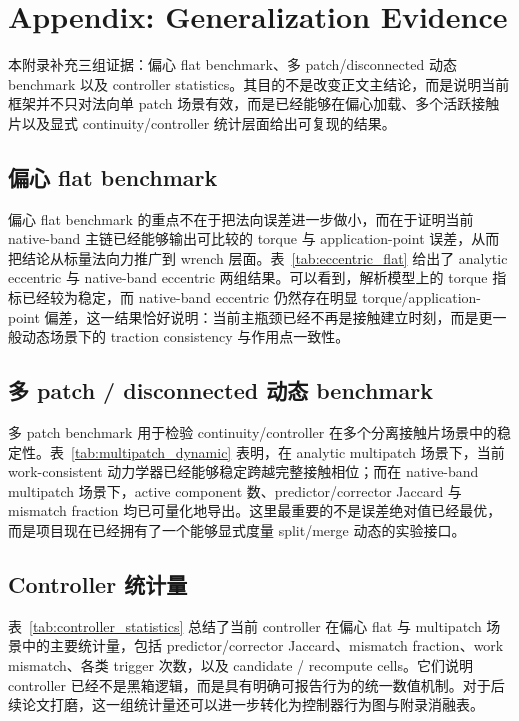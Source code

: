 \section{Appendix: Generalization Evidence}
本附录补充三组证据：偏心 flat benchmark、多 patch/disconnected 动态 benchmark 以及 controller statistics。其目的不是改变正文主结论，而是说明当前框架并不只对法向单 patch 场景有效，而是已经能够在偏心加载、多个活跃接触片以及显式 continuity/controller 统计层面给出可复现的结果。

\subsection{偏心 flat benchmark}
偏心 flat benchmark 的重点不在于把法向误差进一步做小，而在于证明当前 native-band 主链已经能够输出可比较的 torque 与 application-point 误差，从而把结论从标量法向力推广到 wrench 层面。表~\ref{tab:eccentric_flat} 给出了 analytic eccentric 与 native-band eccentric 两组结果。可以看到，解析模型上的 torque 指标已经较为稳定，而 native-band eccentric 仍然存在明显 torque/application-point 偏差，这一结果恰好说明：当前主瓶颈已经不再是接触建立时刻，而是更一般动态场景下的 traction consistency 与作用点一致性。



\subsection{多 patch / disconnected 动态 benchmark}
多 patch benchmark 用于检验 continuity/controller 在多个分离接触片场景中的稳定性。表~\ref{tab:multipatch_dynamic} 表明，在 analytic multipatch 场景下，当前 work-consistent 动力学器已经能够稳定跨越完整接触相位；而在 native-band multipatch 场景下，active component 数、predictor/corrector Jaccard 与 mismatch fraction 均已可量化地导出。这里最重要的不是误差绝对值已经最优，而是项目现在已经拥有了一个能够显式度量 split/merge 动态的实验接口。



\subsection{Controller 统计量}
表~\ref{tab:controller_statistics} 总结了当前 controller 在偏心 flat 与 multipatch 场景中的主要统计量，包括 predictor/corrector Jaccard、mismatch fraction、work mismatch、各类 trigger 次数，以及 candidate / recompute cells。它们说明 controller 已经不是黑箱逻辑，而是具有明确可报告行为的统一数值机制。对于后续论文打磨，这一组统计量还可以进一步转化为控制器行为图与附录消融表。

